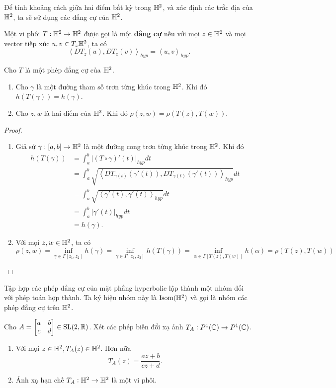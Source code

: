 Để tính khoảng cách giữa hai điểm bất kỳ trong $\mathbb{H}^2$, và xác định các trắc địa của $\mathbb{H}^2$, ta sẽ sử dụng các đẳng cự của $\mathbb{H}^2$.
\begin{defn}
    Một vi phôi $T:\mathbb{H}^2 \to \mathbb{H}^2$ được gọi là một \textbf{đẳng cự} nếu với mọi $z\in \mathbb{H}^2$ và mọi vector tiếp xúc $u,v \in T_z\mathbb{H}^2$, ta có
    \[\left<DT_z(u),DT_z(v)\right>_{hyp} = \left<u,v\right>_{hyp}.\]
\end{defn}
\begin{prop}\label{prop 2.1.10}
    Cho $T$ là một phép đẳng cự của $\mathbb{H}^2$.
    \begin{enumerate}
        \item Cho $\gamma$ là một đường tham số trơn từng khúc trong $\mathbb{H}^2$. Khi đó $h(T(\gamma)) = h(\gamma)$.
        \item Cho $z,w$ là hai điểm của $\mathbb{H}^2$. Khi đó $\rho(z,w) = \rho(T(z),T(w))$.
    \end{enumerate}
\end{prop}
\begin{proof}
    \begin{enumerate}
        \item Giả sử $\gamma: [a,b] \to \mathbb{H}^2$ là một đường cong trơn từng khúc trong $\mathbb{H}^2$. Khi đó
        \begin{align*}
            h(T(\gamma)) &= \int_a^b|(T\circ\gamma)'(t)|_{hyp}dt \\
            &= \int_a^b{\sqrt{\left<DT_{\gamma(t)}(\gamma'(t)),DT_{\gamma(t)}(\gamma'(t))\right>_{hyp}}}dt\\
            &= \int_a^b\sqrt{\left<\gamma'(t),\gamma'(t)\right>_{hyp}}dt\\
            &= \int_a^b|\gamma'(t)|_{hyp}dt\\
            &= h(\gamma).
        \end{align*}

        \item Với mọi $z,w \in \mathbb{H}^2$, ta có
        \[\rho(z,w) = \inf_{\gamma\in \Gamma[z_1,z_2]}{h(\gamma)} = \inf_{\gamma\in \Gamma[z_1,z_2]}{h(T(\gamma))} = \inf_{\alpha  \in \Gamma[T(z),T(w)]}{h(\alpha)} = \rho(T(z),T(w))\]
    \end{enumerate}
\end{proof}
Tập hợp các phép đẳng cự của mặt phẳng hyperbolic lập thành một nhóm đối với phép toán hợp thành. Ta ký hiệu nhóm này là $\operatorname{Isom}(\mathbb{H}^2)$ và gọi là nhóm các phép đẳng cự trên $\mathbb{H}^2$.
\begin{prop}\label{prop 2.1.11}
    Cho $A = \begin{bmatrix} a & b \\ c & d \\ \end{bmatrix} \in \operatorname{SL}(2,\mathbb{R})$. Xét các phép biến đổi xạ ảnh $T_A:P^1(\mathbb{C}) \to P^1(\mathbb{C})$.
    \begin{enumerate}
        \item Với mọi $z\in \mathbb{H}^2, T_A(z) \in \mathbb{H}^2$. Hơn nữa
        \[T_A(z) = \dfrac{az+b}{cz+d}.\]
        \item Ánh xạ hạn chế $T_A: \mathbb{H}^2 \to \mathbb{H}^2$ là một vi phôi.
    \end{enumerate}
\end{prop}
